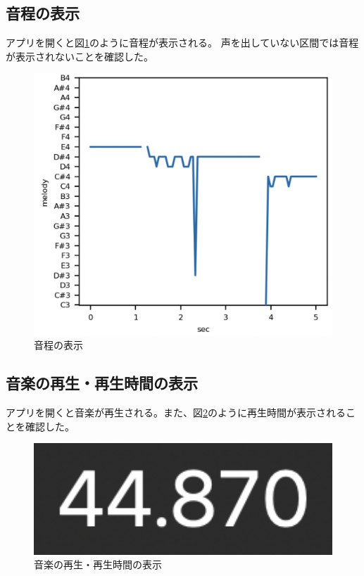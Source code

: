\documentclass[a4paper,11pt]{jsarticle}
\begin{document}
\subsection{音程の表示}
アプリを開くと図\ref{fig:note}のように音程が表示される。
声を出していない区間では音程が表示されないことを確認した。

\begin{figure}[h]
\centering
\includegraphics[keepaspectratio, width=13cm]
{./images/work3_melody.png}
\caption{音程の表示}
\label{fig:note}
\end{figure}

\subsection{音楽の再生・再生時間の表示}
アプリを開くと音楽が再生される。また、図\ref{fig:music}のように再生時間が表示されることを確認した。

\begin{figure}[h]
\centering
\includegraphics[keepaspectratio, width=13cm]
{./images/work3_play_time.png}
\caption{音楽の再生・再生時間の表示}
\label{fig:music}
\end{figure}
\end{document}
